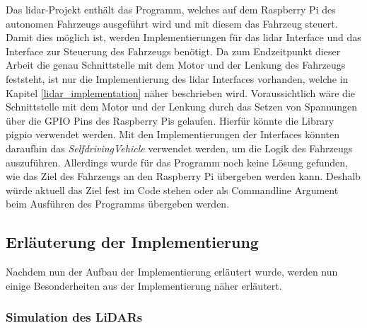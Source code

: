 Das \ac{lidar}-Projekt enthält das Programm, welches auf dem Raspberry Pi des autonomen Fahrzeugs ausgeführt wird und mit diesem das Fahrzeug steuert. Damit dies möglich ist, werden Implementierungen für das \ac{lidar} Interface und das Interface zur Steuerung des Fahrzeugs benötigt. Da zum Endzeitpunkt dieser Arbeit die genau Schnittstelle mit dem Motor und der Lenkung des Fahrzeugs feststeht, ist nur die Implementierung des \ac{lidar} Interfaces vorhanden, welche in Kapitel \ref{lidar_implementation} näher beschrieben wird. Voraussichtlich wäre die Schnittstelle mit dem Motor und der Lenkung durch das Setzen von Spannungen über die GPIO Pins des Raspberry Pis gelaufen. Hierfür könnte die Library pigpio verwendet werden.  Mit den Implementierungen der Interfaces könnten daraufhin das \textit{SelfdrivingVehicle} verwendet werden, um die Logik des Fahrzeugs auszuführen. Allerdings wurde für das Programm noch keine Lösung gefunden, wie das Ziel des Fahrzeugs an den Raspberry Pi übergeben werden kann. Deshalb würde aktuell das Ziel fest im Code stehen oder als Commandline Argument beim Ausführen des Programms übergeben werden. 

\subsection{Erläuterung der Implementierung}

Nachdem nun der Aufbau der Implementierung erläutert wurde, werden nun einige Besonderheiten aus der Implementierung näher erläutert. 

\subsubsection{Simulation des LiDARs}

